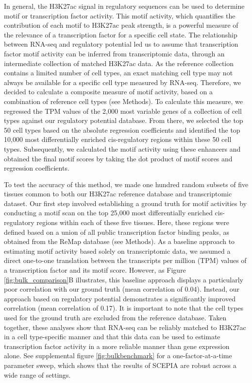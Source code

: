 In general, the H3K27ac signal in regulatory sequences can be used to determine motif or transcription factor activity\cite{FANTOM2009,Balwierz2014,Madsen_2017}. This motif activity, which quantifies the contribution of each motif to H3K27ac peak strength, is a powerful measure of the relevance of a transcription factor for a specific cell state. The relationship between RNA-seq and regulatory potential led us to assume that transcription factor motif activity can be inferred from transcriptomic data, through an intermediate collection of matched H3K27ac data. As the reference collection contains a limited number of cell types, an exact matching cell type may not always be available for a specific cell type measured by RNA-seq. Therefore, we decided to calculate a composite measure of motif activity, based on a combination of reference cell types (see Methods). To calculate this measure, we regressed the TPM values of the 2,000 most variable genes of a collection of cell types against our regulatory potential database. From there, we selected the top 50 cell types based on the absolute regression coefficients and identified the top 10,000 most differentially enriched cis-regulatory regions within these 50 cell types. Subsequently, we calculated the motif activity using these enhancers and obtained the final motif scores by taking the dot product of motif scores and regression coefficients. 

To test the accuracy of this method, we made one hundred random subsets of five tissues common to both our H3K27ac reference database and transcriptomic dataset. Our first step involved establishing a ground truth for motif activities by conducting a motif scan on the top 25,000 most differentially enriched cis-regulatory regions within each of these five tissues. Here, these regions were defined based on a union of all public transcription factor binding peaks, as obtained from the ReMap database\cite{Chneby2017} (see Methods). As a baseline approach to estimating motif activity based solely on transcriptomic data, we assumed a direct one-to-one translation between the transcripts per million (TPM) values of a transcription factor and its motif score. However, as Figure \ref{fig:bulk_comparison}B illustrates, this baseline approach displays a particularly poor correlation with our ground truth (mean correlation of 0.04). Instead, our approach based on regulatory potential demonstrates a significantly improved correlation (mean correlation of 0.17). It is important to note that the cell types used for the ground truth are excluded from the reference database.  Taken together, these analyses show that RNA-seq can be reliably matched to H3K27ac in a cell type-specific manner and that this data can be used to estimate transcription factor activity in a more reliable manner than gene expression alone. See supplemental figure \ref{fig:bulkbenchmark} for a one-factor-at-a-time parameter sweep, which shows that the results of SCEPIA are robust across a wide range of settings.

